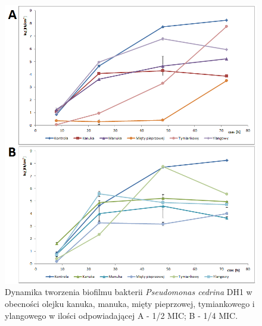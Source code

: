\documentclass[11pt,a4paper]{report}
\begin{document}
\begin{figure}[!h]
\begin{center}
\includegraphics[scale=0.65]{img/dh2-b.png}
\caption{Dynamika tworzenia biofilmu bakterii \textit{Pseudomonas cedrina} DH1 w obecności olejku kanuka, manuka, mięty pieprzowej, tymiankowego i ylangowego w ilości odpowiadającej A - 1/2 MIC; B - 1/4 MIC.}\label{dh2-b}
\end{center} 
\end{figure}
\end{document}

